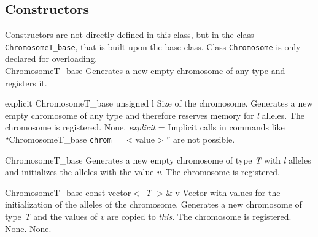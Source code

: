\subsection{Constructors}

Constructors are not directly defined in this class, but in the class
{\tt ChromosomeT\_base}, that is built upon the base class.
Class {\tt Chromosome} is only declared for overloading.\\

\setNormalInstance
\printEmptyMethod
{ChromosomeT\_base}
{Generates a new empty chromosome of any type and registers it.}

\vspace*{4ex}

\setNormalInstance
\printMethodWithOneParam
{explicit}
{ChromosomeT\_base}
{unsigned}
{l}
{Size of the chromosome.}
{Generates a new empty chromosome of any type and therefore reserves
 memory for {\em l} alleles. The chromosome is registered.}
{None.}
{{\em explicit} = Implicit calls in commands like 
 ``ChromosomeT\_base {\tt chrom} = $<$value$>$'' are not possible.}

\clearpage

\setNormalInstance
\setCorrectWidthThree{8pt}
\printMethodWithParamsSaved
{}
{}
{ChromosomeT\_base}
{Generates a new empty chromosome of type {\sl T} with {\em l} alleles
 and initializes the alleles with the value {\em v}. 
 The chromosome is registered.}
{}
\setCorrectWidthThree{4pt}

\vspace*{4ex}

\setNormalInstance
\printMethodWithOneParam
{}
{ChromosomeT\_base}
{const vector$<$ {\sl T} $>$\&}
{v}
{Vector with values for the initialization of the alleles of the chromosome.}
{Generates a new chromosome of type {\sl T} and the values of {\em v}
 are copied to {\em this}. The chromosome is registered.}
{None.}
{None.}
